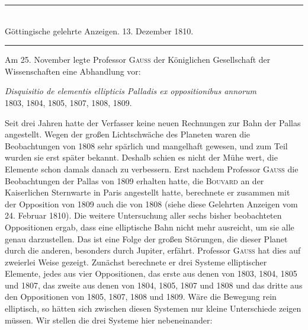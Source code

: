 \clearpage
{}
\begin{center}\rule{.75\textwidth}{.3pt}\\
Göttingische gelehrte Anzeigen. 13. Dezember 1810.\\
\rule{.75\textwidth}{.3pt}\end{center}
Am 25. November legte Professor \textsc{Gauß} der Königlichen Gesellschaft der Wissenschaften eine Abhandlung vor:
\begin{center}
\textit{Disquisitio de elementis ellipticis Palladis ex oppositionibus annorum}\\
1803, 1804, 1805, 1807, 1808, 1809.
\end{center}
Seit drei Jahren hatte der Verfasser keine neuen Rechnungen zur Bahn der Pallas angestellt. Wegen der großen Lichtschwäche des Planeten waren die Beobachtungen von 1808 sehr spärlich und mangelhaft gewesen, und zum Teil wurden sie erst später bekannt. Deshalb schien es nicht der Mühe wert, die Elemente schon damals danach zu verbessern. Erst nachdem Professor \textsc{Gauß} die Beobachtungen der Pallas von 1809 erhalten hatte, die \textsc{Bouvard} an der Kaiserlichen Sternwarte in Paris angestellt hatte, berechnete er zusammen mit der Opposition von 1809 auch die von 1808 (siehe diese Gelehrten Anzeigen vom 24. Februar 1810). Die weitere Untersuchung aller sechs bisher beobachteten Oppositionen ergab, dass eine elliptische Bahn nicht mehr ausreicht, um sie alle genau darzustellen. Das ist eine Folge der großen Störungen, die dieser Planet durch die anderen, besonders durch Jupiter, erfährt. Professor \textsc{Gauß} hat dies auf zweierlei Weise gezeigt. Zunächst berechnete er drei Systeme elliptischer Elemente, jedes aus vier Oppositionen, das erste aus denen von 1803, 1804, 1805 und 1807,
%
das zweite aus denen von 1804, 1805, 1807 und 1808 und das dritte aus den Oppositionen von 1805, 1807, 1808 und 1809. Wäre die Bewegung rein elliptisch, so hätten sich zwischen diesen Systemen nur kleine Unterschiede zeigen müssen. Wir stellen die drei Systeme hier nebeneinander:
\par\nobreak
\begingroup
\newcommand{\GaussVIAngle}[6]{%
  \makebox[17pt][r]{$#1$}\makebox[4pt][l]{${}#2$}\hspace{2pt}%
  \makebox[12pt][r]{$#3$}\makebox[4pt][l]{${}#4$}\hspace{2pt}%
  \makebox[12pt][r]{$#5$}\makebox[18pt][l]{${}#6$}%
}
